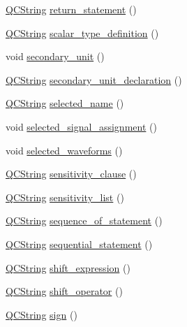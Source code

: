 \begin{DoxyCompactItemize}
\item 
\hyperlink{class_q_c_string}{Q\+C\+String} \hyperlink{classvhdl_1_1parser_1_1_vhdl_parser_a2e19c02eb75c6a6e0a8bdd7df5e298c8}{return\+\_\+statement} ()
\item 
\hyperlink{class_q_c_string}{Q\+C\+String} \hyperlink{classvhdl_1_1parser_1_1_vhdl_parser_aedb09e2bbb6bc473b1b1732cc3fb374c}{scalar\+\_\+type\+\_\+definition} ()
\item 
void \hyperlink{classvhdl_1_1parser_1_1_vhdl_parser_a1021534455adb3d4e0536ccd1bab9499}{secondary\+\_\+unit} ()
\item 
\hyperlink{class_q_c_string}{Q\+C\+String} \hyperlink{classvhdl_1_1parser_1_1_vhdl_parser_a2614cda1f69b4884a0450fcbe1d6d268}{secondary\+\_\+unit\+\_\+declaration} ()
\item 
\hyperlink{class_q_c_string}{Q\+C\+String} \hyperlink{classvhdl_1_1parser_1_1_vhdl_parser_a6978b4826aa79ab21b30c29bab35aea5}{selected\+\_\+name} ()
\item 
void \hyperlink{classvhdl_1_1parser_1_1_vhdl_parser_a70812b721b2dad8f12c952abe201e108}{selected\+\_\+signal\+\_\+assignment} ()
\item 
void \hyperlink{classvhdl_1_1parser_1_1_vhdl_parser_ad2310a8097f8cbdf188b118ed1507ed2}{selected\+\_\+waveforms} ()
\item 
\hyperlink{class_q_c_string}{Q\+C\+String} \hyperlink{classvhdl_1_1parser_1_1_vhdl_parser_ab55dbf934b7eca85ba535c1380f5b0d2}{sensitivity\+\_\+clause} ()
\item 
\hyperlink{class_q_c_string}{Q\+C\+String} \hyperlink{classvhdl_1_1parser_1_1_vhdl_parser_a2a9a628b7267a92c2e7bdc4c4ebaae01}{sensitivity\+\_\+list} ()
\item 
\hyperlink{class_q_c_string}{Q\+C\+String} \hyperlink{classvhdl_1_1parser_1_1_vhdl_parser_a17d82afaf5b84297b67899f70306730c}{sequence\+\_\+of\+\_\+statement} ()
\item 
\hyperlink{class_q_c_string}{Q\+C\+String} \hyperlink{classvhdl_1_1parser_1_1_vhdl_parser_a767d67a24fdcfb1447dbec3de2d2d121}{sequential\+\_\+statement} ()
\item 
\hyperlink{class_q_c_string}{Q\+C\+String} \hyperlink{classvhdl_1_1parser_1_1_vhdl_parser_a089e39151edd78d383bd98f67d33b2c5}{shift\+\_\+expression} ()
\item 
\hyperlink{class_q_c_string}{Q\+C\+String} \hyperlink{classvhdl_1_1parser_1_1_vhdl_parser_aaf58fa6650945acb259088e9db5898f7}{shift\+\_\+operator} ()
\item 
\hyperlink{class_q_c_string}{Q\+C\+String} \hyperlink{classvhdl_1_1parser_1_1_vhdl_parser_a6be35cbe279e286293ba5394c06f6d54}{sign} ()

\end{DoxyCompactItemize}
